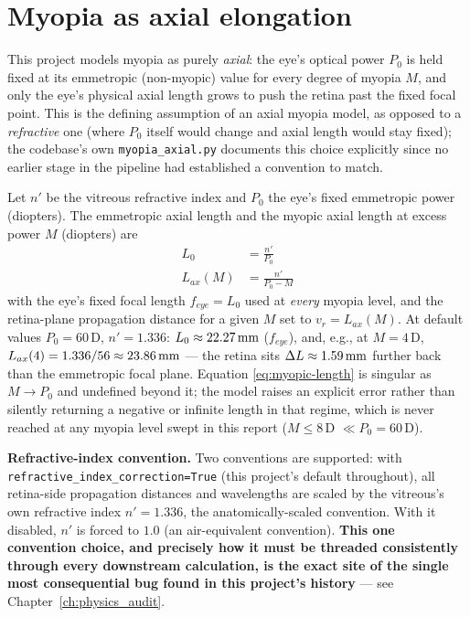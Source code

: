 \section{Myopia as axial elongation}

This project models myopia as purely \emph{axial}: the eye's optical power $P_0$ is
held fixed at its emmetropic (non-myopic) value for every degree of myopia $M$, and
only the eye's physical axial length grows to push the retina past the fixed focal
point. This is the defining assumption of an axial myopia model, as opposed to a
\emph{refractive} one (where $P_0$ itself would change and axial length would stay
fixed); the codebase's own \texttt{myopia\_axial.py} documents this choice explicitly
since no earlier stage in the pipeline had established a convention to match.

Let $n'$ be the vitreous refractive index and $P_0$ the eye's fixed emmetropic power
(diopters). The emmetropic axial length and the myopic axial length at excess power
$M$ (diopters) are
\begin{align}
L_0 &= \frac{n'}{P_0} \label{eq:emmetropic-length}\\
L_{ax}(M) &= \frac{n'}{P_0 - M} \label{eq:myopic-length}
\end{align}
with the eye's fixed focal length $f_{eye}=L_0$ used at \emph{every} myopia level, and
the retina-plane propagation distance for a given $M$ set to $v_r = L_{ax}(M)$. At
default values $P_0=60\,$D, $n'=1.336$: $L_0 \approx 22.27\,\text{mm}$ ($f_{eye}$), and, e.g.,
at $M=4\,$D, $L_{ax}(4) = 1.336/56 \approx 23.86\,\text{mm}$ --- the retina sits
$\Delta L \approx 1.59\,\text{mm}$ further back than the emmetropic focal plane. Equation
\eqref{eq:myopic-length} is singular as $M\to P_0$ and undefined beyond it; the model
raises an explicit error rather than silently returning a negative or infinite length
in that regime, which is never reached at any myopia level swept in this report
($M\le8\,$D $\ll P_0=60\,$D).

\textbf{Refractive-index convention.} Two conventions are supported: with
\texttt{refractive\_index\_correction=True} (this project's default throughout), all
retina-side propagation distances and wavelengths are scaled by the vitreous's own
refractive index $n'=1.336$, the anatomically-scaled convention. With it disabled,
$n'$ is forced to $1.0$ (an air-equivalent convention). \textbf{This one convention
choice, and precisely how it must be threaded consistently through every downstream
calculation, is the exact site of the single most consequential bug found in this
project's history} --- see Chapter~\ref{ch:physics_audit}.

